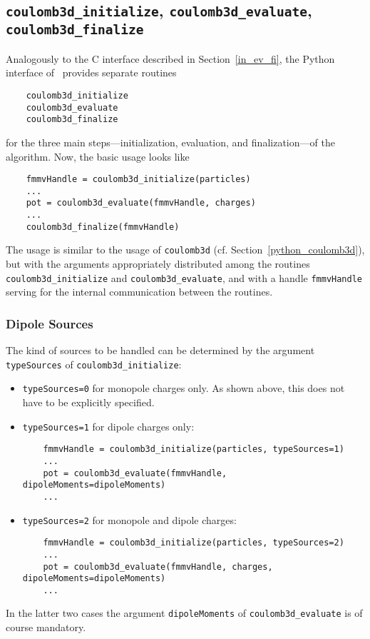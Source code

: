 \subsection{{\tt coulomb3d\_initialize}, 
{\tt coulomb3d\_evaluate},\\
{\tt coulomb3d\_finalize}}
Analogously to the C interface described in Section~\ref{in_ev_fi},
the Python interface of  \fmmv\ provides separate routines
\begin{verbatim}
    coulomb3d_initialize
    coulomb3d_evaluate
    coulomb3d_finalize
\end{verbatim}
for the three main steps---initialization, evaluation, and finalization---of the algorithm.  
Now, the basic usage looks like
\begin{verbatim}
    fmmvHandle = coulomb3d_initialize(particles)
    ...
    pot = coulomb3d_evaluate(fmmvHandle, charges)
    ...
    coulomb3d_finalize(fmmvHandle)
\end{verbatim}
The usage is similar to the usage of \verb|coulomb3d| (cf. Section~\ref{python_coulomb3d}), but
with the arguments 
appropriately distributed among the routines \verb|coulomb3d_initialize| and
\verb|coulomb3d_evaluate|, and with a handle \verb|fmmvHandle| serving for
the internal communication between the routines.
\subsubsection*{Dipole Sources}
The kind of sources to be handled can be determined by the argument 
\verb|typeSources| of \verb|coulomb3d_initialize|:
\begin{itemize}
	\item \verb|typeSources=0| for monopole charges only. As shown above, 
	this does not have to be explicitly specified.
	\item \verb|typeSources=1| for dipole charges only:
\begin{verbatim}
    fmmvHandle = coulomb3d_initialize(particles, typeSources=1)
    ...
    pot = coulomb3d_evaluate(fmmvHandle, dipoleMoments=dipoleMoments)
    ...
\end{verbatim}
	\item \verb|typeSources=2| for monopole and dipole charges:
\begin{verbatim}
    fmmvHandle = coulomb3d_initialize(particles, typeSources=2)
    ...
    pot = coulomb3d_evaluate(fmmvHandle, charges, dipoleMoments=dipoleMoments)
    ...
\end{verbatim}
\end{itemize}
In the latter two cases the argument \verb|dipoleMoments| of \verb|coulomb3d_evaluate|
is of course mandatory.
